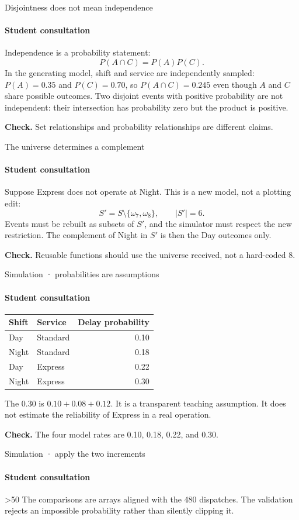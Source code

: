 \documentclass[aspectratio=169,11pt,english]{beamer}
\newcommand{\archivo}[1]{{\footnotesize\texttt{\detokenize{#1}}\par}\smallskip}
\newcommand{\checkit}[1]{\par\smallskip\textbf{Check.} #1\par}
\newcommand{\code}[3]{%
\ifnum#2>50\lstset{gobble=4}\else\lstset{gobble=0}\fi
\ifcase#1\relax
\or%
\or%
\or%
\fi}
\begin{document}
\begin{frame}{Disjointness does not mean independence}
  \framesubtitle{Student consultation}
  Independence is a probability statement:
  \[
    P(A\cap C)=P(A)P(C).
  \]
  In the generating model, shift and service are independently sampled:
  $P(A)=0.35$ and $P(C)=0.70$, so $P(A\cap C)=0.245$ even though $A$ and $C$
  share possible outcomes.
  Two disjoint events with positive probability are not independent: their
  intersection has probability zero but the product is positive.
  \checkit{Set relationships and probability relationships are different claims.}
\end{frame}

\begin{frame}{The universe determines a complement}
  \framesubtitle{Student consultation}
  Suppose Express does not operate at Night. This is a new model, not a plotting edit:
  \[
    S'=S\setminus\{\omega_7,\omega_8\},\qquad |S'|=6.
  \]
  Events must be rebuilt as subsets of $S'$, and the simulator must respect the new
  restriction. The complement of Night in $S'$ is then the Day outcomes only.
  \checkit{Reusable functions should use the universe received, not a hard-coded 8.}
\end{frame}

\begin{frame}{Simulation · probabilities are assumptions}
  \framesubtitle{Student consultation}
  \begin{tabular}{llr}
    \toprule Shift & Service & Delay probability \\ \midrule
    Day & Standard & 0.10\\
    Night & Standard & 0.18\\
    Day & Express & 0.22\\
    Night & Express & 0.30\\ \bottomrule
  \end{tabular}
  \par\medskip
  The 0.30 is $0.10+0.08+0.12$. It is a transparent teaching assumption.
  It does not estimate the reliability of Express in a real operation.
  \checkit{The four model rates are 0.10, 0.18, 0.22, and 0.30.}
\end{frame}

\begin{frame}{Simulation · apply the two increments}
  \framesubtitle{Student consultation}
  \archivo{set_theory_01_sample_space.py}
  \code{1}{118}{123}
  The comparisons are arrays aligned with the 480 dispatches. The validation
  rejects an impossible probability rather than silently clipping it.
\end{frame}
\end{document}
